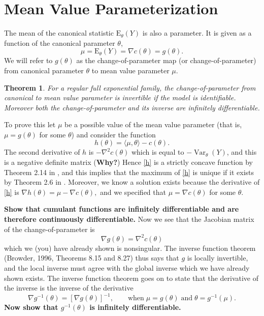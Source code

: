 \documentclass[12pt]{article}
\newcommand{\E}{\mathrm{E}}
\newcommand{\inner}[1]{\langle #1 \rangle}
\DeclareMathOperator{\E}{E}
\DeclareMathOperator{\Var}{Var}
\newtheorem{thm}{Theorem}
\begin{document}
\section*{Mean Value Parameterization}
The mean of the canonical statistic $\E_\theta(Y)$ is also a parameter. It is given as a function of the canonical parameter $\theta$,
\begin{equation} \label{mvp}
  \mu = \E_\theta(Y) = \nabla c(\theta) = g(\theta).	
\end{equation}
We will refer to $g(\theta)$ as the change-of-parameter map (or change-of-parameter) from canonical parameter $\theta$ to mean value parameter $\mu$.


\begin{thm} \label{thm-mvp}
For a regular full exponential family, the change-of-parameter from canonical to mean value parameter is invertible if the model is identifiable. Moreover both the change-of-parameter and its inverse are infinitely differentiable.
\end{thm}

To prove this let $\mu$ be a possible value of the mean value parameter (that is, $\mu = g(\theta)$ for some $\theta$) and consider the function
\begin{equation}\label{h}
  h(\theta) = \inner{\mu,\theta} - c(\theta).	
\end{equation}
The second derivative of $h$ is $-\nabla^2c(\theta)$ which is equal to  $-\Var_\theta(Y)$, and this is a negative definite matrix ({\bf Why?}) %
Hence \eqref{h} is a strictly concave function by Theorem 2.14 in  \cite{rockafellar2009variational}, and this implies that the maximum of \eqref{h} is unique if it exists by Theorem 2.6 in \cite{rockafellar2009variational}. Moreover, we know a solution exists because the derivative of \eqref{h} is
$
  \nabla h(\theta) = \mu - \nabla c(\theta),
$
and we specified that $\mu = \nabla c(\theta)$ for some $\theta$.

{\bf Show that cumulant functions are infinitely differentiable and are therefore continuously differentiable.} Now we see that the Jacobian matrix of the change-of-parameter is 
$$
  \nabla g(\theta) = \nabla^2 c(\theta)
$$
which we (you) have already shown is nonsingular. The inverse function theorem (Browder, 1996, Theorems 8.15 and 8.27) thus says that $g$ is locally invertible, and the local inverse must agree with the global inverse which we have already shown exists. The inverse function theorem goes on to state that the derivative of the inverse is the inverse of the derivative
$$
  \nabla g^{-1}(\theta) = \left[\nabla g(\theta)\right]^{-1}, \qquad \text{when} \; \mu = g(\theta) \; \text{and} \; \theta = g^{-1}(\mu).
$$
{\bf Now show that $g^{-1}(\theta)$ is infinitely differentiable.}
\end{document}
